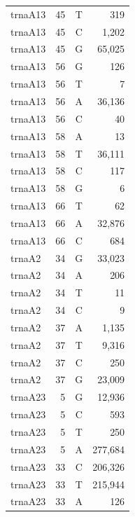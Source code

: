 \documentclass[12pt]{rockefeller}
\begin{document}
\begin{tiny}
\begin{longtable}{|l|r|c|r|}
 trnaA13 &        45 &          T &        319 \\
 trnaA13 &        45 &          C &      1,202 \\
 trnaA13 &        45 &          G &     65,025 \\
 trnaA13 &        56 &          G &        126 \\
 trnaA13 &        56 &          T &          7 \\
 trnaA13 &        56 &          A &     36,136 \\
 trnaA13 &        56 &          C &         40 \\
 trnaA13 &        58 &          A &         13 \\
 trnaA13 &        58 &          T &     36,111 \\
 trnaA13 &        58 &          C &        117 \\
 trnaA13 &        58 &          G &          6 \\
 trnaA13 &        66 &          T &         62 \\
 trnaA13 &        66 &          A &     32,876 \\
 trnaA13 &        66 &          C &        684 \\
  trnaA2 &        34 &          G &     33,023 \\
  trnaA2 &        34 &          A &        206 \\
  trnaA2 &        34 &          T &         11 \\
  trnaA2 &        34 &          C &          9 \\
  trnaA2 &        37 &          A &      1,135 \\
  trnaA2 &        37 &          T &      9,316 \\
  trnaA2 &        37 &          C &        250 \\
  trnaA2 &        37 &          G &     23,009 \\
 trnaA23 &         5 &          G &     12,936 \\
 trnaA23 &         5 &          C &        593 \\
 trnaA23 &         5 &          T &        250 \\
 trnaA23 &         5 &          A &    277,684 \\
 trnaA23 &        33 &          C &    206,326 \\
 trnaA23 &        33 &          T &    215,944 \\
 trnaA23 &        33 &          A &        126 \\

\end{longtable}
\end{tiny}
\end{document}
